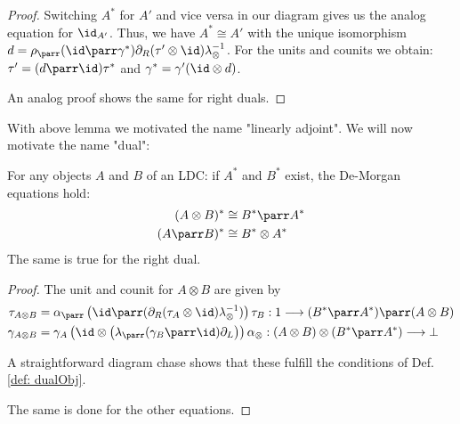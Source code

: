 \documentclass[DIN, pagenumber=false, fontsize=11pt, parskip=half, colorinlistoftodos, svgnames]{scrartcl}
\begin{document}
\begin{proof}
		Switching $A^*$ for $A'$ and vice versa in our diagram gives us the analog equation for $\id_{A'}$. 
		Thus, we have $A^* \cong A'$ with the unique isomorphism 
		$d = \rho_\parr (\id \parr \gamma^*) \partial_R (\tau' \otimes \id) \lambda_\otimes^{-1}$. 
		For the units and counits we obtain: 
		$\tau' = (d \parr \id) \tau^*$ and $\gamma^* = \gamma' (\id \otimes d)$.
		
		An analog proof shows the same for right duals.
	\end{proof}
	
	With above lemma we motivated the name "linearly adjoint". We will now motivate the name "dual":
	
	\begin{lemma}
		\label{lemma: deMorgan}
		For any objects $A$ and $B$ of an LDC: if $A^*$ and $B^*$ exist, the De-Morgan equations hold:
		\begin{align*}
			(A \otimes B)^* & \cong B^* \parr A^* 
			\\
			(A \parr B)^* & \cong B^* \otimes A^*
		\end{align*}
		The same is true for the right dual.
	\end{lemma}
	
	\begin{proof}
		The unit and counit for $A \otimes B$ are given by 
		\begin{align*}
			\tau_{A\otimes B} 
			&= 
			\alpha_\parr
			\left(
				\id \parr (\partial_R(\tau_A \otimes \id)\lambda_\otimes^{-1}) 
			\right)
			\tau_B : 
			1 \longrightarrow (B^* \parr A^*) \parr (A \otimes B) 
			\\
			\gamma_{A \otimes B} 
			&= 
			\gamma_A 
			\left(
				\id \otimes 
				\left(
					\lambda_\parr (\gamma_B \parr \id) \partial_L 
				\right)
			\right)
			\alpha_\otimes :
			(A \otimes B) \otimes (B^* \parr A^*) \longrightarrow \bot
		\end{align*}
		
		A straightforward diagram chase shows that these fulfill the conditions of Def. \ref{def: dualObj}.
		
		The same is done for the other equations.
	\end{proof}
	
	
	
\end{document}
